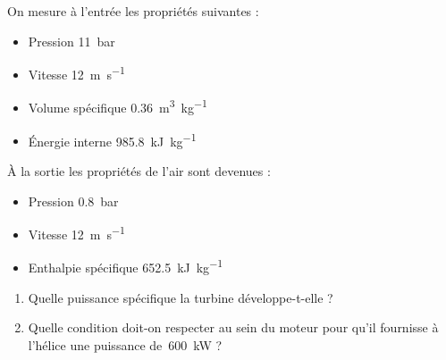 	On mesure à l’entrée les propriétés suivantes :
	\begin{itemize}
		\item Pression 		\tab \SI{11}{\bar}
		\item Vitesse 		\tab \SI{12}{\metre\per\second}
		\item Volume spécifique 		\tab \SI{0,36}{\metre\cubed\per\kilogram}
		\item Énergie interne 		\tab \SI{985,8}{\kilo\joule\per\kilogram}
	\end{itemize}
	
	À la sortie les propriétés de l’air sont devenues :	
	\begin{itemize}
		\item Pression 		\tab \SI{0,8}{\bar}
		\item Vitesse 		\tab \SI{12}{\metre\per\second}
		\item Enthalpie spécifique 		\tab \SI{652,5}{\kilo\joule\per\kilogram}
	\end{itemize}

	\begin{enumerate}
		\item Quelle puissance spécifique la turbine développe-t-elle ?
		\item Quelle condition doit-on respecter au sein du moteur pour qu’il fournisse à l’hélice une puissance de~\SI{600}{\kilo\watt} ?
	\end{enumerate}

\exercisesolutionpage
\titreresultats

